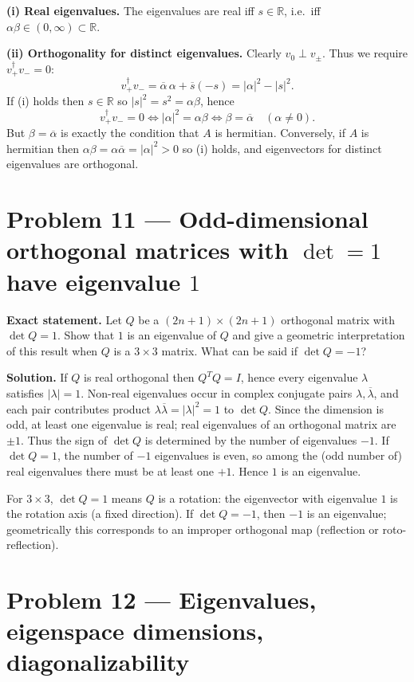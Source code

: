 \documentclass[12pt,a4paper]{article}
\theoremstyle{plain}
\theoremstyle{definition}      %
\begin{document}
\textbf{(i) Real eigenvalues.}
The eigenvalues are real iff \(s\in\mathbb R\), i.e.\ iff \(\alpha\beta\in(0,\infty)\subset\mathbb R\).

\textbf{(ii) Orthogonality for distinct eigenvalues.}
Clearly \(v_0\perp v_\pm\). Thus we require \(v_+^\dagger v_-=0\):
\[
v_+^\dagger v_-=\overline\alpha\,\alpha+\overline s(-s)=|\alpha|^2-|s|^2.
\]
If (i) holds then \(s\in\mathbb R\) so \(|s|^2=s^2=\alpha\beta\), hence
\[
v_+^\dagger v_-=0 \iff |\alpha|^2=\alpha\beta \iff \beta=\overline\alpha \quad(\alpha\neq 0).
\]
But \(\beta=\overline\alpha\) is exactly the condition that \(A\) is hermitian. Conversely, if \(A\) is hermitian then
\(\alpha\beta=\alpha\overline\alpha=|\alpha|^2>0\) so (i) holds, and eigenvectors for distinct eigenvalues are orthogonal.


\section*{Problem 11 — Odd-dimensional orthogonal matrices with \(\det=1\) have eigenvalue \(1\)}

\textbf{Exact statement.}
Let \(Q\) be a \((2n+1)\times(2n+1)\) orthogonal matrix with \(\det Q=1\).
Show that \(1\) is an eigenvalue of \(Q\) and give a geometric interpretation of this result when \(Q\) is a \(3\times3\) matrix.
What can be said if \(\det Q=-1\)?

\textbf{Solution.}
If \(Q\) is real orthogonal then \(Q^TQ=I\), hence every eigenvalue \(\lambda\) satisfies \(|\lambda|=1\).
Non-real eigenvalues occur in complex conjugate pairs \(\lambda,\overline\lambda\), and each pair contributes product
\(\lambda\overline\lambda=|\lambda|^2=1\) to \(\det Q\).
Since the dimension is odd, at least one eigenvalue is real; real eigenvalues of an orthogonal matrix are \(\pm 1\).
Thus the sign of \(\det Q\) is determined by the number of eigenvalues \(-1\).
If \(\det Q=1\), the number of \(-1\) eigenvalues is even, so among the (odd number of) real eigenvalues there must be at least one \(+1\).
Hence \(1\) is an eigenvalue.

For \(3\times3\), \(\det Q=1\) means \(Q\) is a rotation: the eigenvector with eigenvalue \(1\) is the rotation axis (a fixed direction).
If \(\det Q=-1\), then \(-1\) is an eigenvalue; geometrically this corresponds to an improper orthogonal map (reflection or roto-reflection).


\section*{Problem 12 — Eigenvalues, eigenspace dimensions, diagonalizability}
\end{document}

